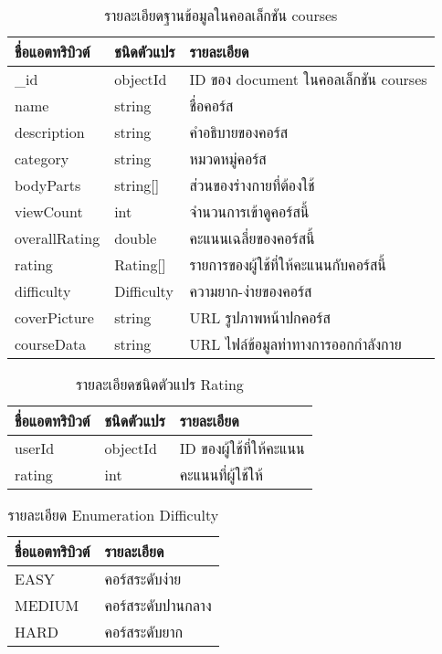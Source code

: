 \begin{table}
    \caption{รายละเอียดฐานข้อมูลในคอลเล็กชัน courses}
    \begin{tabularx}{\textwidth}{ | l | l | X | }
        \hline
        \bf ชื่อแอตทริบิวต์ & \bf ชนิดตัวแปร & \bf รายละเอียด \\\hline
        \_id & objectId & ID ของ document ในคอลเล็กชัน courses\\\hline
        name & string & ชื่อคอร์ส\\\hline
        description & string & คำอธิบายของคอร์ส\\\hline
        category & string & หมวดหมู่คอร์ส\\\hline
        bodyParts & string[] & ส่วนของร่างกายที่ต้องใช้\\\hline
        viewCount & int & จำนวนการเข้าดูคอร์สนี้\\\hline
        overallRating & double & คะแนนเฉลี่ยของคอร์สนี้\\\hline
        rating & Rating[] & รายการของผู้ใช้ที่ให้คะแนนกับคอร์สนี้\\\hline
        difficulty & Difficulty & ความยาก-ง่ายของคอร์ส\\\hline
        coverPicture & string & URL รูปภาพหน้าปกคอร์ส\\\hline
        courseData & string & URL ไฟล์ข้อมูลท่าทางการออกกำลังกาย\\\hline
    \end{tabularx}
\end{table}

\begin{table}
    \caption{รายละเอียดชนิดตัวแปร Rating}
    \begin{tabularx}{\textwidth}{ | l | l | X | }
        \hline
        \bf ชื่อแอตทริบิวต์ & \bf ชนิดตัวแปร & \bf รายละเอียด \\\hline
        userId & objectId & ID ของผู้ใช้ที่ให้คะแนน\\\hline
        rating & int & คะแนนที่ผู้ใช้ให้\\\hline
    \end{tabularx}
\end{table}

\begin{table}
    \caption{รายละเอียด Enumeration Difficulty}
    \begin{tabularx}{\textwidth}{ | l | X | }
        \hline
        \bf ชื่อแอตทริบิวต์ & \bf รายละเอียด \\\hline
        EASY & คอร์สระดับง่าย\\\hline
        MEDIUM & คอร์สระดับปานกลาง\\\hline
        HARD & คอร์สระดับยาก\\\hline
    \end{tabularx}
\end{table}

